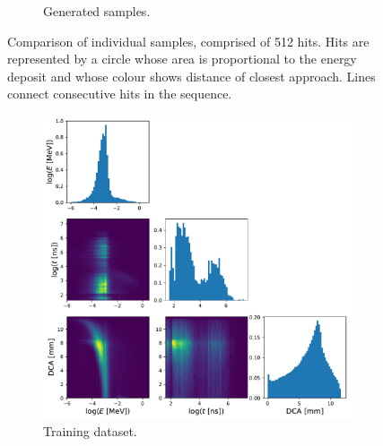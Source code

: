 \begin{figure}
\begin{subfigure}[t]{0.48\textwidth}
        \caption{Generated samples.}
    \end{subfigure}
    \caption{
        Comparison of individual samples, comprised of 512 hits. Hits are
        represented by a circle whose area is proportional to the energy deposit
        and whose colour shows distance of closest approach. 
        Lines connect consecutive hits in the sequence.
    }
    \label{fig:comp_uncurated}
\end{figure}

\begin{figure}
    \centering
    \captionsetup[subfigure]{justification=centering}
    \begin{subfigure}[t]{0.48\textwidth}
        \centering
        \hspace{-1cm} %
        \includegraphics[width=\textwidth]{chapter4/feature_matrix_real.pdf}
        \caption{Training dataset.}
    \end{subfigure}
    \quad
    \begin{subfigure}[t]{0.48\textwidth}
        \centering
        \hspace{-1cm} %

\end{subfigure}
\end{figure}
